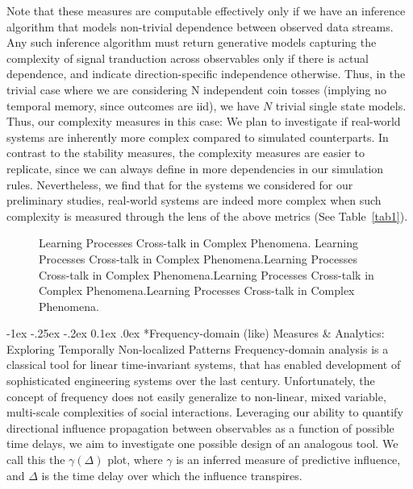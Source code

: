 \documentclass[onecolumn, compsoc,11pt]{IEEEtran}
\makeatletter
\renewcommand\subsection{\@startsection {section}{1}{\z@}%
  {-1ex \@plus -.25ex \@minus -.2ex}%
  {0.1ex \@plus.0ex}%
  {\fontsize{11}{10}\selectfont\bfseries\sffamily\color{DodgerBlue4}}}
\renewcommand{\captionN}[1]{\caption{\color{CadetBlue4!80!black} \sffamily \fontsize{10}{11}\selectfont #1  }}
\makeatother
\begin{document}
Note that these measures are computable effectively only if we have an inference algorithm that models non-trivial dependence between observed data streams. Any such inference algorithm must return generative models capturing the complexity of signal tranduction across observables  only if there is actual dependence, and indicate  direction-specific independence otherwise. Thus, in the trivial case where  we are considering N independent coin tosses (implying no temporal memory, since outcomes are iid), we have $N$ trivial single state models. Thus, our complexity measures in this case: 
We plan to investigate if real-world systems are inherently more complex compared to simulated counterparts. In contrast to the stability measures, the complexity measures are easier to replicate, since we can always define in more dependencies in our simulation rules. Nevertheless, we find that for the systems we considered for our preliminary studies, real-world systems are indeed more complex when such complexity is measured through the lens of the above metrics  (See Table~\ref{tab1}).
%
\begin{figure}
  \tikzexternalenable
  
  
  \vspace{-25pt}
  
  \captionN{Learning Processes Cross-talk in Complex Phenomena. Learning Processes Cross-talk in Complex Phenomena.Learning Processes Cross-talk in Complex Phenomena.Learning Processes Cross-talk in Complex Phenomena.Learning Processes Cross-talk in Complex Phenomena.}\label{figgamma}
\end{figure}
\subsection*{Frequency-domain (like)  Measures \& Analytics: Exploring Temporally Non-localized Patterns}
Frequency-domain analysis is a classical tool for linear time-invariant systems, that has enabled development of sophisticated engineering systems over the last century. Unfortunately, the concept of frequency does not easily generalize to non-linear, mixed variable, multi-scale complexities of social interactions. Leveraging our ability to quantify directional influence propagation between observables as a function of possible time delays, we aim to investigate one possible design of an analogous tool. We call this the $\gamma(\Delta)$ plot, where $\gamma$ is an inferred measure of predictive influence, and $\Delta$ is the time delay over which the influence transpires.
\end{document}

